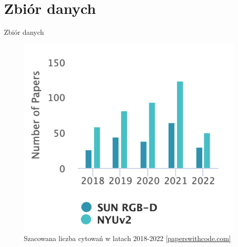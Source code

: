 \documentclass[10pt]{beamer}
\begin{document}
\section*{Zbiór danych}
\begin{frame}{Zbiór danych}
    \begin{figure}
        \includegraphics[height=0.7\textheight]{images/stats-dataset.png}
        \caption[]{Szacowana liczba cytowań w latach 2018-2022 \href{https://paperswithcode.com/dataset/sun-rgb-d}{[paperswithcode.com]}}
    \end{figure}
\end{frame}
\end{document}
